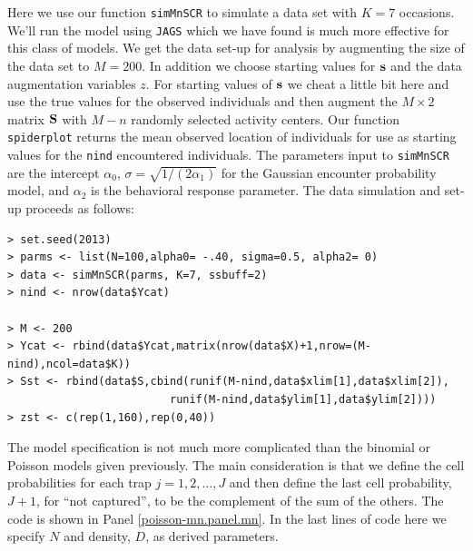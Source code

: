 Here we use our function \mbox{\tt simMnSCR} to simulate a data set
with $K=7$ occasions.  We'll run the model using \mbox{\tt JAGS} which
we have found is much more effective for this class of models.  We get
the data set-up for analysis by augmenting the size of the data set to
$M=200$. In addition we choose starting values for ${\bf s}$ and the
data augmentation variables $z$.  For starting values of ${\bf s}$ we
cheat a little bit here and use the true values for the observed
individuals and then augment the $M \times 2$ matrix ${\bf S}$ with
$M-n$ randomly selected activity centers. Our function \mbox{\tt
  spiderplot} returns the mean observed location of individuals for
use as starting values for the \mbox{\tt nind} encountered
individuals.  The parameters input to \mbox{\tt simMnSCR} are the
intercept $\alpha_{0}$, $\sigma = \sqrt{1/(2\alpha_{1})}$ for the
Gaussian encounter probability model, and $\alpha_{2}$ is the
behavioral response parameter. The data simulation and set-up proceeds
as follows: 
{\small
\begin{verbatim}
> set.seed(2013)
> parms <- list(N=100,alpha0= -.40, sigma=0.5, alpha2= 0)
> data <- simMnSCR(parms, K=7, ssbuff=2)
> nind <- nrow(data$Ycat)

> M <- 200
> Ycat <- rbind(data$Ycat,matrix(nrow(data$X)+1,nrow=(M-nind),ncol=data$K))
> Sst <- rbind(data$S,cbind(runif(M-nind,data$xlim[1],data$xlim[2]),
                         runif(M-nind,data$ylim[1],data$ylim[2])))
> zst <- c(rep(1,160),rep(0,40))
\end{verbatim}
}


The model specification is not much more complicated than the binomial
or Poisson models given previously. The main consideration is that we
define the cell probabilities for each trap $j=1,2,\dots,J$ and then
define the last cell probability, $J+1$, for ``not captured'', to be
the complement of the sum of the others. The code is shown in Panel
\ref{poisson-mn.panel.mn}.  In the last lines of code here we specify
$N$ and density, $D$, as derived parameters.

